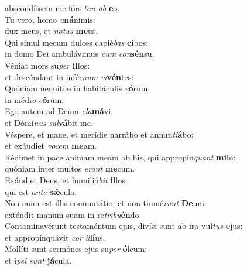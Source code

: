 \oddverse abscondíssem me fórsi\textit{tan} \textit{ab} \textbf{e}o.\\
\evenverse Tu vero, homo \textit{u}\textbf{ná}nimis:~\*\\
\evenverse dux meus, et \textit{no}\textit{tus} \textbf{me}us.\\
\oddverse Qui simul mecum dulces capié\textit{bas} \textbf{ci}bos:~\*\\
\oddverse in domo Dei ambulávimus \textit{cum} \textit{con}\textbf{sén}su.\\
\evenverse Véniat mors su\textit{per} \textbf{il}los:~\*\\
\evenverse et descéndant in infér\textit{num} \textit{vi}\textbf{vén}tes:\\
\oddverse Quóniam nequítiæ in habitáculis \textit{e}\textbf{ó}rum:~\*\\
\oddverse in médi\textit{o} \textit{e}\textbf{ó}rum.\\
\evenverse Ego autem ad Deum \textit{cla}\textbf{má}vi:~\*\\
\evenverse et Dómi\textit{nus} \textit{sal}\textbf{vá}bit me.\\
\oddverse Véspere, et mane, et merídie narrábo et annun\textit{ti}\textbf{á}bo:~\*\\
\oddverse et exáudiet \textit{vo}\textit{cem} \textbf{me}am.\\
\evenverse Rédimet in pace ánimam meam ab his, qui appropín\textit{quant} \textbf{mi}hi:~\*\\
\evenverse quóniam inter multos \textit{e}\textit{rant} \textbf{me}cum.\\
\oddverse Exáudiet Deus, et humiliá\textit{bit} \textbf{il}los:~\*\\
\oddverse qui est \textit{an}\textit{te} \textbf{sǽ}cula.\\
\evenverse Non enim est illis commutátio, et non timué\textit{runt} \textbf{De}um:~\*\\
\evenverse exténdit manum suam in re\textit{tri}\textit{bu}\textbf{én}do.\\
\oddverse Contaminavérunt testaméntum ejus, divísi sunt ab ira vul\textit{tus} \textbf{e}jus:~\*\\
\oddverse et appropinquávit \textit{cor} \textit{il}\textbf{lí}us.\\
\evenverse Mollíti sunt sermónes ejus su\textit{per} \textbf{ó}leum:~\*\\
\evenverse et i\textit{psi} \textit{sunt} \textbf{já}cula.\\
